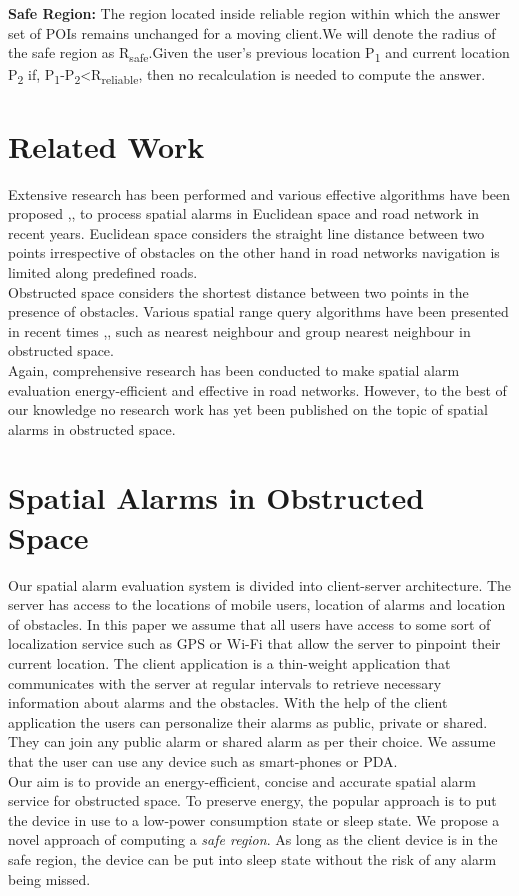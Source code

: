 \documentclass{sig-alternate}
\begin{document}
\begin{defn}\textbf{Safe Region:} 
The region located inside reliable region within which the answer set of POIs remains unchanged for a moving client.We will denote the radius of the safe region as R\textsubscript{safe}.Given the user's previous location P\textsubscript{1} and current location P\textsubscript{2} if, P\textsubscript{1}-P\textsubscript{2}<R\textsubscript{reliable}, then no recalculation is needed to compute the answer.
\end{defn}

\section{Related Work}
Extensive research has been performed and various  effective algorithms have been proposed \cite{roadalarm},\cite{mur},\cite{bamba} to process spatial alarms in Euclidean space and road network in recent years. Euclidean space considers the straight line distance between two points irrespective of obstacles on the other hand in road networks navigation is limited along predefined roads.\\ Obstructed space considers the shortest distance between two points in the presence of obstacles. Various spatial range query algorithms have been presented in recent times \cite{obst1},\cite{obst2},\cite{ognn} such as nearest neighbour and group nearest neighbour in obstructed space.\\
Again, comprehensive research \cite{liu} has been conducted to make spatial alarm evaluation energy-efficient and effective in road networks. 
However, to the best of our knowledge no research work has yet been published on the topic of spatial alarms in obstructed space.
\\

\section{Spatial Alarms in Obstructed Space}
Our spatial alarm evaluation system is divided into client-server architecture. The server has access to the locations of mobile users, location of alarms and location of obstacles. In this paper we assume that all users have access to some sort of localization service such as GPS or Wi-Fi that allow the server to pinpoint their current location. The client application is a thin-weight application that communicates with the server at regular intervals to retrieve necessary information about alarms and the obstacles. With the help of the client application the users can personalize their alarms as public, private or shared. They can join any public alarm or shared alarm as per their choice. We assume that the user can use any device such as smart-phones or PDA.\\ Our aim is to provide an energy-efficient, concise and accurate spatial alarm service for obstructed space. To preserve energy, the popular approach is to put the device in use to a low-power consumption state or sleep state. We propose a novel approach of computing a \textit{safe region}. As long as the client device is in the safe region, the device can be put into sleep state without the risk of any alarm being missed. \\
\end{document}
